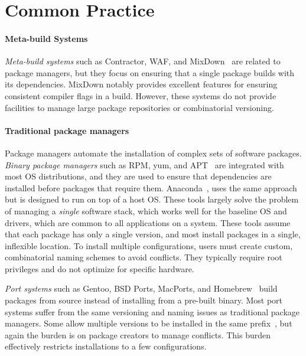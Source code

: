 
\section{Common Practice}
\label{sec:motivation}

\paragraph{Meta-build Systems}
{\it Meta-build systems} such as Contractor, WAF, and
MixDown~\cite{amundson:contractor,epperly+:mixdown,epperly+:mixdown-report,nagy:waf} are
related to package managers, but they focus on ensuring that a single
package builds with its dependencies.  MixDown notably provides excellent
features for ensuring consistent compiler flags in a build.
However, these systems do not provide facilities to manage
large package repositories or combinatorial versioning.

\paragraph{Traditional package managers}
Package managers automate the installation of complex sets of software packages.
{\it Binary package managers} such as RPM, yum, and APT~\cite{foster+:rpm03,silva:apt01,yum} are integrated with most
OS distributions, and they are used to ensure that dependencies
are installed before packages that require them.
Anaconda~\cite{anaconda,conda}, uses the same approach but
is designed to run on top of a host OS.
These tools largely solve the problem of managing a {\it single} software
stack, which works well for the baseline OS and drivers, which are
common to all applications on a system.
These tools assume that each package has only a single version,
and most install packages in a single, inflexible location.
To install multiple configurations, users must create custom, combinatorial
naming schemes to avoid conflicts. They typically require root
privileges and do not optimize for specific hardware.

{\it Port systems} such as Gentoo, BSD Ports, MacPorts, and
Homebrew~\cite{bsdports,groffen:gentoo-prefix,homebrew,macports,thiruvathukal:gentoo04}
build packages from source instead of installing from a pre-built binary.
Most port systems suffer from
the same versioning and naming issues as traditional package managers.
Some allow multiple versions to be installed in the same
prefix~\cite{groffen:gentoo-prefix}, but again the burden is on package
creators to manage conflicts. This burden effectively restricts installations
to a few configurations.


